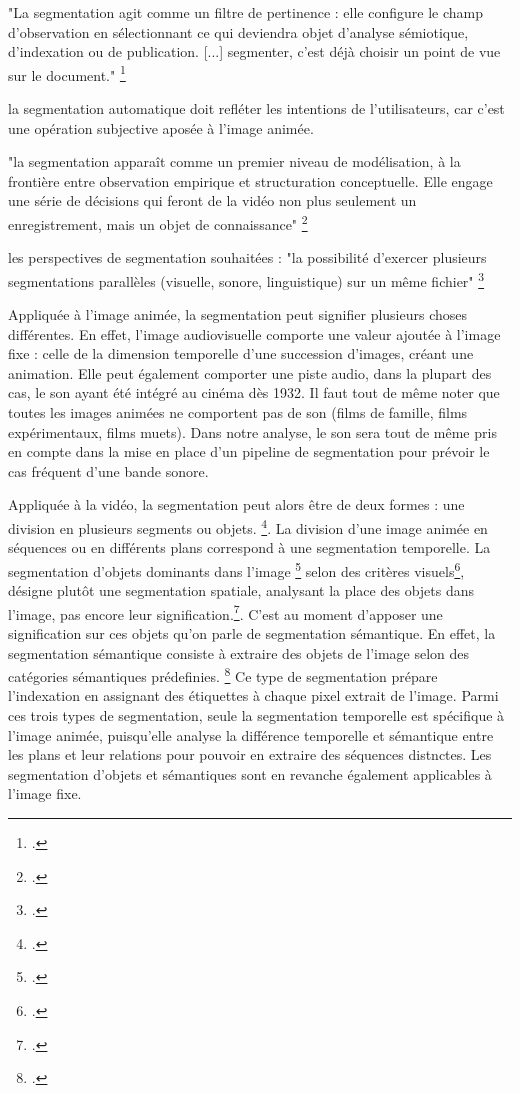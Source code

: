 \begin{itemize}
"La segmentation agit comme un filtre de pertinence : elle configure le champ d’observation en sélectionnant ce qui deviendra objet d’analyse sémiotique, d’indexation ou de publication. [...] segmenter, c’est déjà choisir un point de vue sur le document." \footcite{stockinger2011}

la segmentation automatique doit refléter les intentions de l'utilisateurs, car c'est une opération subjective aposée à l'image animée. 

"la segmentation apparaît comme un premier niveau de
modélisation, à la frontière entre observation empirique et structuration conceptuelle. Elle engage une série de décisions qui feront de la vidéo non plus seulement un enregistrement, mais un objet de connaissance" \footcite{stockinger2011}

les perspectives de segmentation souhaitées : "la possibilité d’exercer plusieurs segmentations parallèles (visuelle,
sonore, linguistique) sur un même fichier" \footcite{stockinger2011}



Appliquée à l'image animée, la segmentation peut signifier plusieurs choses différentes. En effet, l'image audiovisuelle comporte une valeur ajoutée à l'image fixe : celle de la dimension temporelle d'une succession d'images, créant une animation. Elle peut également comporter une piste audio, dans la plupart des cas, le son ayant été intégré au cinéma dès 1932. Il faut tout de même noter que toutes les images animées ne comportent pas de son (films de famille, films expérimentaux, films muets). Dans notre analyse, le son sera tout de même pris en compte dans la mise en place d'un pipeline de segmentation pour prévoir le cas fréquent d'une bande sonore. 

Appliquée à la vidéo, la segmentation peut alors être de deux formes : une division en plusieurs segments ou objets. \footcite{zhou2022}. La division d'une image animée en séquences ou en différents plans correspond à une segmentation temporelle. La segmentation d'objets dominants dans l'image \footcite{zhou2022}
selon des critères visuels\footcite{carrive2014}, désigne plutôt une segmentation spatiale, analysant la place des objets dans l'image, pas encore leur signification.\footcite{zhou2022}. 
C'est au moment d'apposer une signification sur ces objets qu'on parle de segmentation sémantique. En effet, la segmentation sémantique consiste à extraire des objets de l'image selon des catégories sémantiques prédefinies. \footcite{zhou2022} Ce type de segmentation prépare l'indexation en assignant des étiquettes à chaque pixel extrait de l'image. 
Parmi ces trois types de segmentation, seule la segmentation temporelle est spécifique à l'image animée, puisqu'elle analyse la différence temporelle et sémantique entre les plans et leur relations pour pouvoir en extraire des séquences distnctes. Les segmentation d'objets et sémantiques sont en revanche également applicables à l'image fixe. 


\end{itemize}
